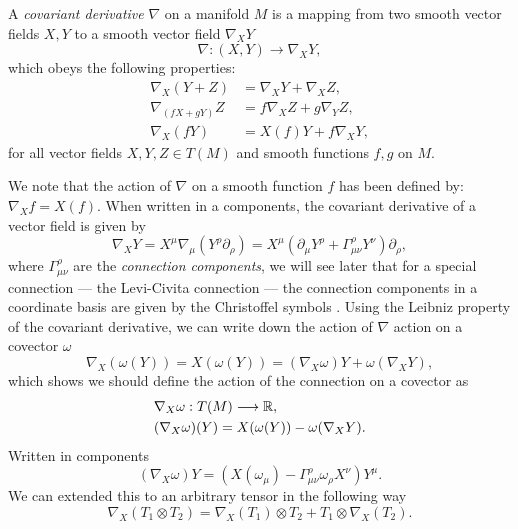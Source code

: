 \begin{defn}
	A \emph{covariant derivative} $\nabla$ on a manifold $M$ is a mapping from two smooth vector fields $X,Y$ to a smooth vector field $\nabla_X Y$ 
	\begin{equation*}
		\nabla : (X, Y) \longrightarrow \nabla_X Y,
	\end{equation*}
	which obeys the following properties:
	\begin{equation*}
		\begin{aligned}
	\nabla_X(Y + Z) &= \nabla_X Y + \nabla_X Z, \\
	 \nabla_{(fX + gY)} Z &= f\nabla_X Z + g\nabla_Y Z, \\
	 \nabla_X(fY) &= X(f) Y + f\nabla_X Y,
		\end{aligned}
	\end{equation*}
	for all vector fields $X,Y,Z \in T(M)$ and smooth functions $f,g$ on $M$. 
\end{defn}
We note that the action of $\nabla$ on a smooth function $f$ has been defined by: $\nabla_X f = X(f)$. When written in a components, the covariant derivative of a vector field is given by
\begin{equation*}
	\nabla_X Y = X^\mu \nabla_\mu (Y^\rho \partial_\rho) = X^\mu \left(\partial_\mu Y^\rho + \Gamma^{\rho}_{\mu \nu} Y^\nu \right) \partial_\rho,
\end{equation*}
where $\Gamma^{\rho}_{\mu \nu}$ are the \emph{connection components}, we will see later that for a special connection --- the Levi-Civita connection --- the connection components in a coordinate basis are given by the Christoffel symbols . Using the Leibniz property of the covariant derivative, we can write down the action of $\nabla$ action on a covector $\omega$
\begin{equation*}
	\nabla_X(\omega(Y)) = X(\omega(Y)) = (\nabla_X \omega) Y + \omega (\nabla_X Y),
\end{equation*} 
which shows we should define the action of the connection on a covector as
\begin{equation*}
\begin{aligned}
	&\nabla_X \omega : T(M) \longrightarrow {\mathbb{R}}, \\
    &(\nabla_X \omega) (Y) = X(\omega(Y)) -  \omega (\nabla_X Y).
\end{aligned}
\end{equation*}
Written in components
\begin{equation*}
	(\nabla_X \omega) Y = (X(\omega_\mu) - \Gamma^{\rho}_{\mu \nu} \omega_\rho X^\nu) Y^\mu.
\end{equation*}
We can extended this to an arbitrary tensor in the following way
\begin{equation*}
	\nabla_X (T_1 \otimes T_2) = \nabla_X (T_1) \otimes T_2 + T_1 \otimes \nabla_X (T_2) .
\end{equation*} 

